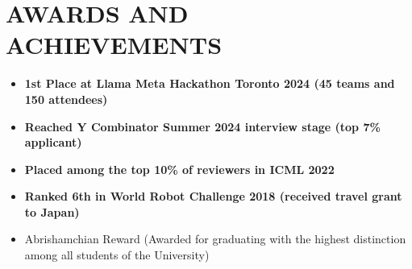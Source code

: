 \section{AWARDS AND ACHIEVEMENTS}
\begin{minipage}{\maincolumnwidth}%
	\small{
    	\begin{itemize}
                \item \textbf{1st Place at Llama Meta Hackathon Toronto 2024 (45 teams and 150 attendees) \href{}{}}
            \item \textbf{Reached Y Combinator Summer 2024 interview stage (top 7\% applicant)}
                \item \textbf{Placed among the \textbf{top 10\% of reviewers} in ICML 2022}
    			\item \textbf{Ranked 6th in World Robot Challenge 2018 (received travel grant to Japan)}%
    	    \item {Abrishamchian Reward (Awarded for graduating with the highest distinction among all students of the University)}


\end{itemize}}
\end{minipage}
